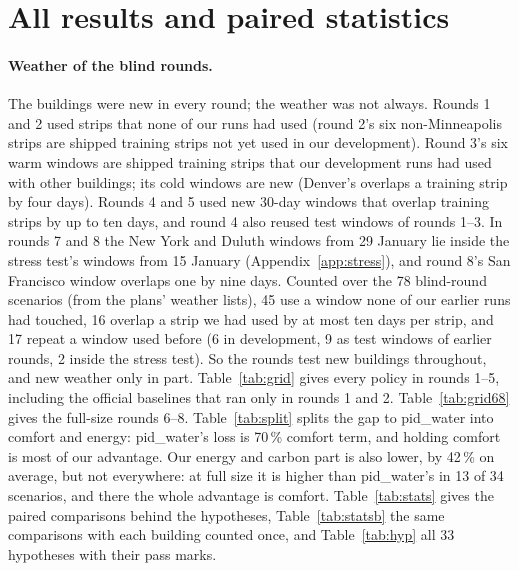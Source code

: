 \documentclass{article}
\begin{document}
\section{All results and paired statistics}\label{app:stats}
\paragraph{Weather of the blind rounds.}\label{app:wx}
The buildings were new in every round; the weather was not always. Rounds 1 and 2 used strips that none of our runs
had used (round 2's six non-Minneapolis strips are shipped training strips not yet used in our development). Round 3's
six warm windows are shipped training strips that our development runs had used with other buildings; its cold
windows are new (Denver's overlaps a training strip by four days). Rounds 4 and 5 used new 30-day windows that overlap
training strips by up to ten days, and round 4 also reused test windows of rounds 1--3. In rounds 7 and 8 the New York
and Duluth windows from 29 January lie inside the stress test's windows from 15 January (Appendix~\ref{app:stress}),
and round 8's San Francisco window overlaps one by nine days. Counted over the 78 blind-round scenarios (from the plans'
weather lists), 45 use a window none of our earlier runs had touched, 16 overlap a strip we had used by at most ten
days per strip, and 17 repeat a window used before (6 in development, 9 as test windows of earlier rounds, 2 inside the
stress test). So the rounds test new buildings throughout, and new weather only in part.
Table~\ref{tab:grid} gives every policy in rounds 1--5, including the official baselines that ran only in rounds 1
and 2. Table~\ref{tab:grid68} gives the full-size rounds 6--8. Table~\ref{tab:split} splits the gap to pid\_water
into comfort and energy: pid\_water's loss is 70\,\% comfort term, and holding comfort is most of our advantage. Our
energy and carbon part is also lower, by 42\,\% on average, but not everywhere: at full size it is higher than
pid\_water's in 13 of 34 scenarios, and there the whole advantage is comfort. Table~\ref{tab:stats} gives the paired
comparisons behind the hypotheses, Table~\ref{tab:statsb} the same comparisons with each building counted once, and
Table~\ref{tab:hyp} all 33 hypotheses with their pass marks.
\end{document}
